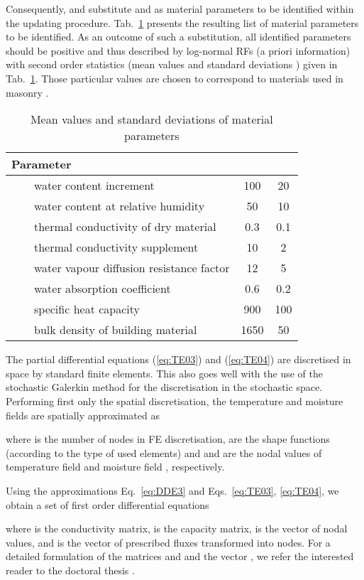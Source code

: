\documentclass[preprint,12pt]{elsarticle}
\begin{document}
Consequently,  and  substitute 
and  as material parameters to be identified within
the updating procedure.  Tab.~\ref{tab_params} presents the
resulting list of  material parameters to be identified. As
an outcome of such a substitution, all identified parameters
should be positive and thus described by log-normal RFs (a priori
information) with second order statistics (mean values  and
standard deviations ) given in Tab.~\ref{tab_params}.
Those particular values are chosen to correspond to materials used
in masonry \cite{Pavlik:SFR:2010}.
\begin{table}[h!]
\centering
\begin{tabular}{lllcc}
\multicolumn{3}{l}{Parameter} &  &  \\
\hline
 &  &  water content
increment & 100 & 20 \\
 &  &  water content at  relative humidity & 50 & 10 \\
 &  &  thermal conductivity of dry material & 0.3 & 0.1 \\
 &  &  thermal conductivity supplement & 10 & 2  \\
 &  &  water vapour diffusion resistance factor & 12 & 5 \\
 &  &  water absorption
coefficient & 0.6 & 0.2 \\
 &  &  specific heat capacity & 900 & 100 \\
 &  &  bulk density of building material & 1650 & 50 \\
\hline
\end{tabular}
\caption{Mean values and standard deviations of
  material parameters} \label{tab_params}
\end{table}

The partial differential equations
(\ref{eq:TE03}) and (\ref{eq:TE04}) are discretised in space by
standard finite elements.  This also goes well with the
use of the stochastic Galerkin method for the discretisation
in the stochastic space. Performing first only the spatial
discretisation, the
temperature and moisture fields are spatially approximated as

where  is the number of nodes in FE discretisation,
 are the shape functions (according to the type of
used elements) and  and  are the nodal
values of temperature field  and moisture field ,
respectively.

Using the approximations Eq.~\eqref{eq:DDE3} and Eqs.~\eqref{eq:TE03},
\eqref{eq:TE04}, we obtain a set of first order differential equations

where  is the conductivity matrix,
 is the capacity matrix,
 is the vector of
nodal values, and  is the vector of prescribed fluxes
transformed into nodes. For a detailed formulation of the matrices
 and  and the vector
, we refer the interested reader to the doctoral thesis
\cite[Chapter 3.1]{Sykora:2010:phd}.
\end{document}
